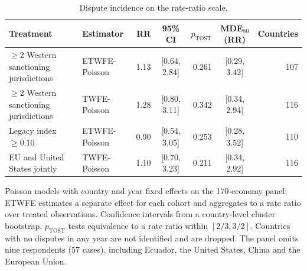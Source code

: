 \begin{table}[t]
\centering
\caption{Dispute incidence on the rate-ratio scale.}
\label{tab:incidencegen}
\small
\begin{tabular}{llrcrcr}
\toprule
Treatment & Estimator & RR & 95\% CI & $p_{\mathrm{TOST}}$ & MDE$_{80}$ (RR) & Countries \\
\midrule
$\geq$2 Western sanctioning jurisdictions & ETWFE-Poisson & 1.13 & [0.64, 2.84] & 0.261 & [0.29, 3.42] & 107 \\
$\geq$2 Western sanctioning jurisdictions & TWFE-Poisson & 1.28 & [0.80, 3.11] & 0.342 & [0.34, 2.94] & 116 \\
Legacy index $\geq 0.10$ & ETWFE-Poisson & 0.90 & [0.54, 3.05] & 0.253 & [0.28, 3.52] & 110 \\
EU and United States jointly & TWFE-Poisson & 1.10 & [0.70, 3.23] & 0.211 & [0.34, 2.92] & 116 \\
\bottomrule
\end{tabular}
\par\medskip
\begin{minipage}{0.95\linewidth}\footnotesize
Poisson models with country and year fixed effects on the 170-economy panel; ETWFE estimates a separate effect for each cohort \citep{wooldridge2023} and aggregates to a rate ratio over treated observations. Confidence intervals from a country-level cluster bootstrap. $p_{\mathrm{TOST}}$ tests equivalence to a rate ratio within $[2/3, 3/2]$. Countries with no disputes in any year are not identified and are dropped. The panel omits nine respondents (57 cases), including Ecuador, the United States, China and the European Union.
\end{minipage}
\end{table}
